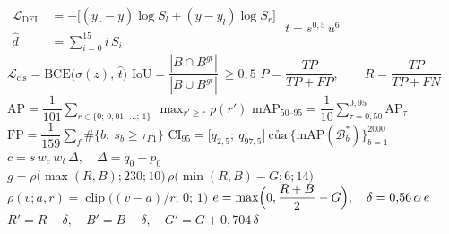 \documentclass[border=1.5pt,multi=eqn]{standalone}
\newenvironment{eqn}[1]{\fontsize{18}{22}\selectfont\color[HTML]{#1}$\displaystyle}{$}
\begin{document}
\begin{eqn}{0E2238}\begin{aligned}\mathcal{L}_{\text{DFL}}&=-\bigl[(y_{r}-y)\log S_{l}+(y-y_{l})\log S_{r}\bigr]\\ \hat d&=\textstyle\sum_{i=0}^{15}i\,S_i\end{aligned}\end{eqn}
\begin{eqn}{0E2238}t=s^{0{,}5}\,u^{6}\end{eqn}
\begin{eqn}{0E2238}\mathcal{L}_{\text{cls}}=\mathrm{BCE}\bigl(\sigma(z),\,\hat t\bigr)\end{eqn}
\begin{eqn}{0E2238}\mathrm{IoU}=\dfrac{|B\cap B^{gt}|}{|B\cup B^{gt}|}\ \ge 0{,}5\end{eqn}
\begin{eqn}{0E2238}P=\dfrac{TP}{TP+FP},\qquad R=\dfrac{TP}{TP+FN}\end{eqn}
\begin{eqn}{0E2238}\mathrm{AP}=\dfrac{1}{101}\sum_{r\in\{0;\,0{,}01;\,\dots;\,1\}}\ \max_{r'\ge r}p(r')\end{eqn}
\begin{eqn}{0E2238}\mathrm{mAP}_{50\text{–}95}=\dfrac{1}{10}\sum_{\tau=0{,}50}^{0{,}95}\mathrm{AP}_{\tau}\end{eqn}
\begin{eqn}{0E2238}\mathrm{FP}=\dfrac{1}{159}\sum_{f}\#\bigl\{b:\ s_b\ge\tau_{F1}\bigr\}\end{eqn}
\begin{eqn}{0E2238}\mathrm{CI}_{95}=\bigl[q_{2{,}5};\ q_{97{,}5}\bigr]\ \text{của}\ \bigl\{\mathrm{mAP}(\mathcal{B}^{*}_{b})\bigr\}_{b=1}^{2000}\end{eqn}
\begin{eqn}{0E2238}c=s\,w_e\,w_t\,\Delta,\quad \Delta=q_0-p_0\end{eqn}
\begin{eqn}{0E2238}g=\rho\bigl(\max(R,B);230;10\bigr)\,\rho\bigl(\min(R,B)-G;6;14\bigr)\end{eqn}
\begin{eqn}{0E2238}\rho(v;a,r)=\operatorname{clip}\bigl((v-a)/r;\,0;\,1\bigr)\end{eqn}
\begin{eqn}{0E2238}e=\max\Bigl(0,\dfrac{R+B}{2}-G\Bigr),\quad \delta=0{,}56\,\alpha\,e\end{eqn}
\begin{eqn}{0E2238}R'=R-\delta,\quad B'=B-\delta,\quad G'=G+0{,}704\,\delta\end{eqn}
\end{document}
